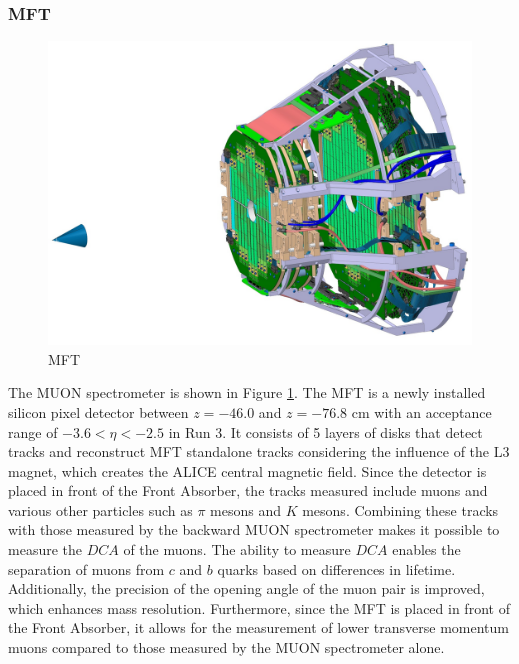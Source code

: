         \subsubsection{MFT}
            \begin{figure}[htbp]
                \centering
                \includegraphics[keepaspectratio, scale=0.17]{fig/2_3_MFT.jpg}
                \caption{MFT}
                \label{MFT}
            \end{figure}
            The MUON spectrometer is shown in Figure \ref{MFT}\cite{MFT_TDR}. The MFT is a newly installed silicon pixel detector between $z=-46.0$ and $z=-76.8$ cm with an acceptance range of $-3.6 < \eta < -2.5$ in Run 3. It consists of 5 layers of disks that detect tracks and reconstruct MFT standalone tracks considering the influence of the L3 magnet, which creates the ALICE central magnetic field. Since the detector is placed in front of the Front Absorber, the tracks measured include muons and various other particles such as $\pi$ mesons and $K$ mesons. Combining these tracks with those measured by the backward MUON spectrometer makes it possible to measure the $DCA$ of the muons. The ability to measure $DCA$ enables the separation of muons from $c$ and $b$ quarks based on differences in lifetime. Additionally, the precision of the opening angle of the muon pair is improved, which enhances mass resolution. Furthermore, since the MFT is placed in front of the Front Absorber, it allows for the measurement of lower transverse momentum muons compared to those measured by the MUON spectrometer alone.


